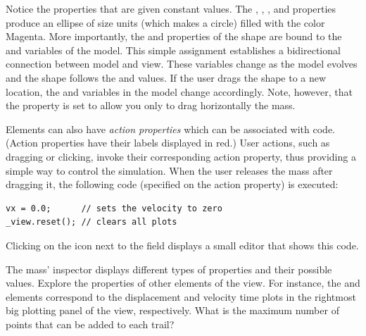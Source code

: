 Notice the properties that are given constant values. The , , , and  properties produce an ellipse of size  units (which makes a circle) filled with the color
Magenta. More importantly, the  and  properties of  the shape are bound to the  and 
variables of the model. This simple assignment establishes a bidirectional connection between model and view. These
variables change as the model evolves and the shape follows the  and  values. If the user drags the
shape to a new location, the  and  variables in the model change accordingly.  Note, however, that the  property is set to allow you only to drag horizontally the mass.

Elements can also have \emph{action properties} which can be associated with code.
(Action properties have their labels displayed in red.) User actions, such as dragging or clicking, invoke their
corresponding action property, thus providing a simple way to control the simulation. When the user releases the mass after dragging it, the following code (specified on the  action property) is executed:

\begin{listing}
\begin{verbatim}
vx = 0.0;      // sets the velocity to zero
_view.reset(); // clears all plots
\end{verbatim}
\end{listing}

\noindent Clicking on the icon next to the field displays a small editor that shows this code.


\begin{exercise}\label{ex:03ExplorationJavascript/properties}
The mass' inspector displays different types of properties and their possible values. Explore the properties of other
elements of the view.  For instance, the  and  elements correspond to the
displacement and velocity time plots in the rightmost big plotting panel of the view, respectively.  What is the maximum number of points that can be added to each trail?
\end{exercise}

